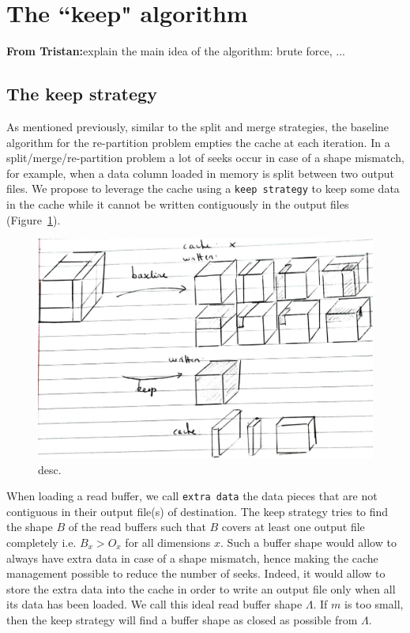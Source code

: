 \documentclass[sigconf, nonacm]{acmart}
\newcommand{\tristan}[1]{\color{orange}\textbf{From Tristan:}#1\color{black}}
\begin{document}


\section{The ``keep" algorithm}

\tristan{explain the main idea of the algorithm: brute force, ...}

\subsection{The keep strategy}
As mentioned previously, similar to the split and merge strategies, the baseline
algorithm for the re-partition problem empties the cache at each iteration. In a
split/merge/re-partition problem a lot of seeks occur in case of a shape mismatch,
for example, when a data column loaded in memory is split between two output
files. We propose to leverage the cache using a \texttt{keep strategy}
to keep some data in the cache while it cannot be written contiguously in the
output files (Figure~\ref{fig:keepvsbaseline}).

\begin{figure}[h]
\centering
\includegraphics[scale=0.25]{./figures/new/naive_vs_keep.jpeg}
\caption{desc.}
\label{fig:keepvsbaseline}
\end{figure}

When loading a read buffer, we call \texttt{extra data} the data pieces that
are not contiguous in their output file(s) of destination.
The keep strategy tries to find the shape $B$ of the read buffers such that $B$ covers
at least one output file completely i.e. $B_x>O_x$ for all dimensions $x$.
Such a buffer shape would allow to always have extra data in case of a shape
mismatch, hence making the cache management possible to reduce the number of seeks.
Indeed, it would allow to store the extra data into the cache in order to write
an output file only when all its data has been loaded.
We call this ideal read buffer shape $\Lambda$.
If $m$ is too small, then the keep strategy will find a buffer
shape as closed as possible from $\Lambda$.
\end{document}
